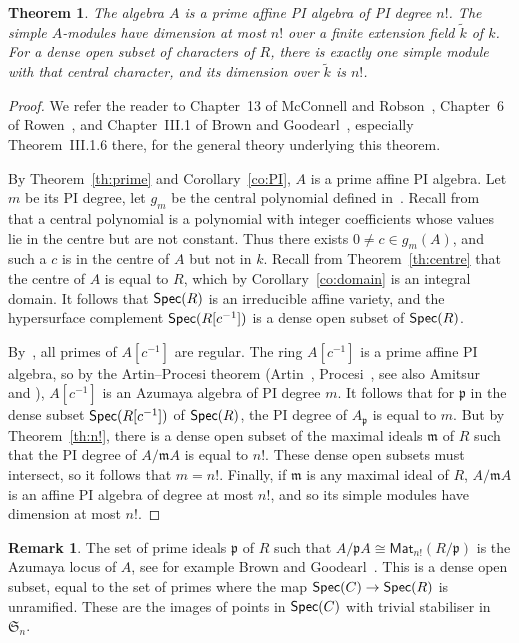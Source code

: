 \documentclass[12pt]{amsart}
\newcommand{\Mat}{\mathsf{Mat}}
\newcommand{\Spec}{\operatorname{\sf Spec}}
\newcommand{\sym}[1]{\mathfrak{S}_{#1}}
\newcommand{\mfm}{\mathfrak{m}}
\newcommand{\mfp}{\mathfrak{p}}
\numberwithin{equation}{section}
\newtheorem{theorem}[equation]{Theorem}
\theoremstyle{definition}
\newtheorem{remark}[equation]{Remark}
\begin{document}
\begin{theorem}\label{th:n!2}
The algebra $A$ is a prime affine PI algebra of PI degree $n!$.
The simple $A$-modules have dimension at most $n!$ over a finite
extension field $\tilde k$ of $k$. For 
a dense open subset of characters of $R$, there is exactly one 
simple module with that central character, and its dimension over
$\tilde k$ is $n!$.
\end{theorem}
\begin{proof}
We refer the reader to Chapter~13 of McConnell and
Robson~\cite{McConnell/Robson:2001a}, Chapter~6 of Rowen~\cite{Rowen:1988b}, and
Chapter~III.1 of Brown and Goodearl~\cite{Brown/Goodearl:2002a},
especially Theorem~III.1.6 there,
for the general theory underlying this theorem.
 
By Theorem~\ref{th:prime} and Corollary~\ref{co:PI}, $A$ is a prime
affine PI algebra. Let $m$ be its PI degree, let $g_m$ be the
central polynomial defined in~\cite[\S13.5.11]{McConnell/Robson:2001a}.
Recall from~\cite[\S13.5.2]{McConnell/Robson:2001a} that a central
polynomial is a polynomial with integer coefficients whose values
lie in the centre but are not constant. Thus there exists
$0\ne c\in g_m(A)$, and such a $c$ is in the centre of $A$ but not in
$k$. Recall from
Theorem~\ref{th:centre} that the centre of $A$ is equal to $R$, which
by Corollary~\ref{co:domain} is an integral domain. It follows that
$\Spec(R)$ is an irreducible affine variety, and
the hypersurface complement
$\Spec(R[c^{-1}])$ is a dense open subset of $\Spec(R)$. 

By~\cite[Proposition~13.7.4]{McConnell/Robson:2001a}, 
all primes of $A[c^{-1}]$ are regular. The ring $A[c^{-1}]$ is a prime
affine PI algebra, so by the Artin--Procesi theorem
(Artin~\cite{Artin:1969a}, Procesi~\cite{Procesi:1972a}, see also
Amitsur~\cite{Amitsur:1973a} and
\cite[Theorem~13.7.14]{McConnell/Robson:2001a}),  $A[c^{-1}]$ is an
Azumaya algebra of PI degree $m$.
It follows that for $\mfp$ in the dense subset $\Spec(R[c^{-1}])$ of
$\Spec(R)$, the PI degree of $A_\mfp$ is 
equal to $m$. But by 
Theorem~\ref{th:n!}, there is a dense open 
subset of the maximal ideals $\mfm$ of $R$ such that the PI
degree of $A/\mfm A$ is equal to $n!$. These dense open subsets must
intersect, so it follows that $m=n!$.
Finally, if $\mfm$ is any maximal ideal of $R$, $A/\mfm A$ is an
affine PI algebra of degree at most $n!$, and so its simple modules
have dimension at most $n!$.
\end{proof}

\begin{remark}\label{rk:Azumaya-locus}
The set of prime ideals $\mfp$ of $R$ such that $A/\mfp A\cong
\Mat_{n!}(R/\mfp)$ is the Azumaya locus of $A$, see for example
Brown and Goodearl~\cite{Brown/Goodearl:1997a,Brown/Goodearl:2002a}. 
This is a dense open subset, 
equal to the set of primes where the map $\Spec(C)\to\Spec(R)$ is
unramified. These are the images of points in $\Spec(C)$ with
trivial stabiliser in $\sym{n}$.
\end{remark}
\end{document}
